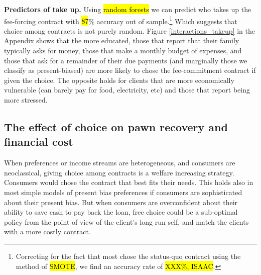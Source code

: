 \documentclass[11pt]{article}
\begin{document}
\vspace{.1in}
\noindent \textbf{Predictors of take up.} Using \hl{random forests} we can predict who takes up the fee-forcing contract with \hl{87}\% accuracy out of sample.\footnote{Correcting for the fact that most chose the status-quo contract using the method of \hl{SMOTE}, \cite{smote} we find an accuracy rate of \hl{XXX\%, ISAAC}.} Which suggests that choice among contracts is not purely random. Figure \ref{interactions_takeup} in the Appendix shows that the more educated, those that report that their family typically asks for money, those that make a monthly budget of expenses, and those that ask for a remainder of their due payments (and marginally those we classify as present-biased) are more likely to chose the fee-commitment contract if given the choice. The opposite holds for clients that are more economically vulnerable (can barely pay for food, electricity, etc) and those that report being more stressed.


\subsection{The effect of choice on pawn recovery and financial cost} \label{effect_choice}

When preferences or income streams are heterogeneous, and consumers are neoclassical, giving choice among contracts is a welfare increasing strategy. Consumers would chose the contract that best fits their needs. This holds also in most simple models of present bias preferences if consumers are sophisticated about their present bias. %
But when consumers are overconfident about their ability to save cash to pay back the loan, free choice could be a sub-optimal policy from the point of view of the client's long run self, and match the clients with a more costly contract. 
\end{document}
